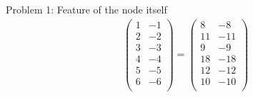 \documentclass[notheorems, aspectratio=54]{beamer}
\begin{document}
\begin{frame}{Problem 1: Feature of the node itself}
\begin{gather*}
\begin{pmatrix}
		1 & -1\\
		2 & -2\\
		3 & -3\\
		4 & -4\\
		5 & -5\\
		6 & -6\\
	\end{pmatrix} = \begin{pmatrix}
	8 & -8\\
	11 & -11\\
	9 & -9\\
	18 & -18\\
	12 & -12\\
	10 & -10\\
	\end{pmatrix}
	\end{gather*}
	\end{frame}
\end{document}
